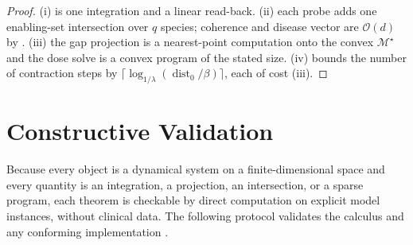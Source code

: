 \documentclass[11pt,a4paper]{article}
\theoremstyle{cfcthm}
\theoremstyle{definition}
\theoremstyle{remark}
\newcommand{\Man}{\mathcal{M}}          %
\newcommand{\Coh}{\Man^{\star}}         %
\newcommand{\flo}{\beta}                %
\newcommand{\dist}{\operatorname{dist}}
\begin{document}
\begin{proof}
(i) is one integration and a linear read-back. (ii) each probe adds one
enabling-set intersection over $q$ species; coherence and disease vector are
$\mathcal{O}(d)$ by . (iii) the gap projection is a
nearest-point computation onto the convex $\Coh$ and the dose solve is a convex
program of the stated size. (iv)  bounds the number of
contraction steps by $\lceil\log_{1/\lambda}(\dist_0/\flo)\rceil$, each of cost
(iii).
\end{proof}

\section{Constructive Validation}
\label{sec:validation}

Because every object is a dynamical system on a finite-dimensional space and
every quantity is an integration, a projection, an intersection, or a sparse
program, each theorem is checkable by direct computation on explicit model
instances, without clinical data. The following protocol validates the calculus
and any conforming implementation \citep{sandve2013ten,wilkinson2016fair}.
\end{document}
